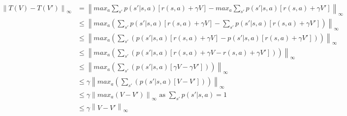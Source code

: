 
\begin{align*}
    \left\| T(V) - T(V') \right\|_{\infty}
    &= \left\| max_a \sum_{s'} p(s'|s,a)[r(s,a)+\gamma V] - max_a \sum_{s'} p(s'|s,a)[r(s,a)+\gamma V'] \right\|_{\infty} \\
    &\leq \left\| max_a \left( \sum_{s'} p(s'|s,a)[r(s,a)+\gamma V] - \sum_{s'} p(s'|s,a)[r(s,a)+\gamma V'] \right) \right\|_{\infty} \\
    &\leq \left\| max_a \left( \sum_{s'} \left( p(s'|s,a)[r(s,a)+\gamma V] - p(s'|s,a)[r(s,a)+\gamma V'] \right) \right) \right\|_{\infty} \\
    &\leq \left\| max_a \left( \sum_{s'} \left( p(s'|s,a)[r(s,a)+\gamma V - r(s,a)+\gamma V'] \right) \right) \right\|_{\infty} \\
    &\leq \left\| max_a \left( \sum_{s'} \left( p(s'|s,a)[\gamma V - \gamma V'] \right) \right) \right\|_{\infty} \\
    &\leq \gamma \left\| max_a \left( \sum_{s'} \left( p(s'|s,a)[V - V'] \right) \right) \right\|_{\infty} \\
    &\leq \gamma \left\| max_a \left(V - V' \right) \right\|_{\infty} \text{ as } \sum_{s'} p(s'|s,a) = 1 \\
    &\leq \gamma \left\| V - V' \right\|_{\infty} \\
\end{align*}

